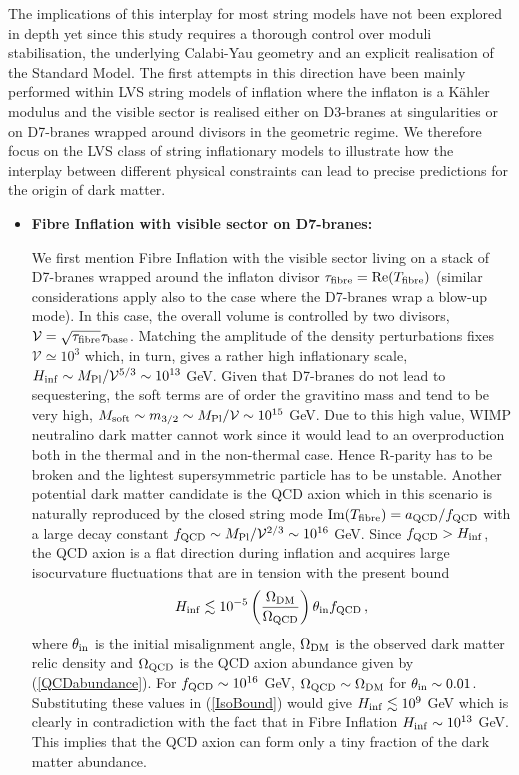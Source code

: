 The implications of this interplay for most string models have not been explored in depth yet since this study requires a thorough control over moduli stabilisation, the underlying Calabi-Yau geometry and an explicit realisation of the Standard Model. The first attempts in this direction have been mainly performed within LVS string models of inflation where the inflaton is a K\"ahler modulus and the visible sector is realised either on D3-branes at singularities or on D7-branes wrapped around divisors in the geometric regime. We therefore focus on the LVS class of string inflationary models to illustrate how the interplay between different physical constraints can lead to precise predictions for the origin of dark matter.
\begin{itemize}
\item \textbf{Fibre Inflation with visible sector on D7-branes:}

We first mention Fibre Inflation \cite{Cicoli:2008gp} with the visible sector living on a stack of D7-branes wrapped around the inflaton divisor $\tau_{\rm fibre} = {\rm Re}(T_{\rm fibre})$ (similar considerations apply also to the case where the D7-branes wrap a blow-up mode). In this case, the overall volume is controlled by two divisors, $\mathcal{V}=\sqrt{\tau_{\rm fibre}}\tau_{\rm base}$. Matching the amplitude of the density perturbations fixes $\mathcal{V}\simeq 10^3$ which, in turn, gives a rather high inflationary scale, $H_{\rm inf}\sim M_{\rm Pl}/\mathcal{V}^{5/3}\sim 10^{13}$ GeV. Given that D7-branes do not lead to sequestering, the soft terms are of order the gravitino mass and tend to be very high, $M_{\rm soft}\sim m_{3/2} \sim M_{\rm Pl}/\mathcal{V} \sim 10^{15}$ GeV. Due to this high value, WIMP neutralino dark matter cannot work since it would lead to an overproduction both in the thermal and in the non-thermal case. Hence R-parity has to be broken and the lightest supersymmetric particle has to be unstable. Another potential dark matter candidate is the QCD axion which in this scenario is naturally reproduced by the closed string mode ${\rm Im}(T_{\rm fibre})= a_{\rm QCD}/f_{\rm QCD}$ with a large decay constant $f_{\rm QCD} \sim M_{\rm Pl}/\mathcal{V}^{2/3}\sim 10^{16}$ GeV. Since $f_{\rm QCD}>H_{\rm inf}$, the QCD axion is a flat direction during inflation and acquires large isocurvature fluctuations that are in tension with the present bound
\begin{equation}
H_{\rm inf}   \lesssim 10^{-5}\left(\frac{\Omega_{\rm DM}}{\Omega_{\rm QCD}}\right) \theta_{\rm in} f_{\rm QCD}\,,
\label{IsoBound}
\end{equation}
where $\theta_{\rm in}$ is the initial misalignment angle, $\Omega_{\rm DM}$ is the observed dark matter relic density and $\Omega_{\rm QCD}$ is the QCD axion abundance given by (\ref{QCDabundance}). For $f_{\rm QCD}\sim 10^{16}$ GeV, $\Omega_{\rm QCD}\sim \Omega_{\rm DM}$ for $\theta_{\rm in}\sim 0.01$. Substituting these values in (\ref{IsoBound}) would give $H_{\rm inf}\lesssim 10^9$ GeV which is clearly in contradiction with the fact that in Fibre Inflation $H_{\rm inf}\sim 10^{13}$ GeV. This implies that the QCD axion can form only a tiny fraction of the dark matter abundance. 


\end{itemize}
